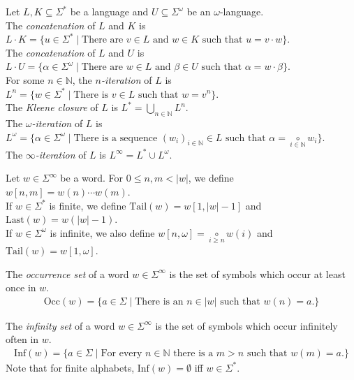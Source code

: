 \begin{defn}
	Let $L, K \subseteq \Sigma^*$ be a language and $U \subseteq \Sigma^\omega$ be an $\omega$-language.\\
	The \emph{concatenation} of $L$ and $K$ is $L \cdot K = \{ u \in \Sigma^* \mid \text{There are } v \in L \text{ and } \allowbreak w \in K \text{ such that } u = v \cdot w\}$.\\
	The \emph{concatenation} of $L$ and $U$ is $L \cdot U = \{ \alpha \in \Sigma^\omega \mid \text{There are } w \in L \text{ and } \allowbreak \beta \in U \text{ such that } \alpha = w \cdot \beta\}$.\\
	For some $n \in \mathbb{N}$, the \emph{$n$-iteration} of $L$ is $L^n = \{ w \in \Sigma^* \mid \text{There is } v \in L \text{ such that } w = v^n\}$.\\
	The \emph{Kleene closure} of $L$ is $L^* = \bigcup\limits_{n \in \mathbb{N}} L^n$.\\
	The \emph{$\omega$-iteration} of $L$ is $L^\omega = \{\alpha \in \Sigma^\omega \mid \text{There is a sequence } (w_i)_{i \in \mathbb{N}} \in L \text{ such that } \alpha = \underset{i \in \mathbb{N}}{\circ} w_i \}$.\\
	The \emph{$\infty$-iteration} of $L$ is $L^\infty = L^* \cup L^\omega$.
\end{defn}

\begin{defn}
	Let $w \in \Sigma^\infty$ be a word. For $0 \leq n, m < |w|$, we define $w[n,m] = w(n) \cdots w(m)$. \\
	If $w \in \Sigma^*$ is finite, we define $\text{Tail}(w) = w[1,|w|-1]$ and $\text{Last}(w) = w(|w|-1)$. \\
	If $w \in \Sigma^\omega$ is infinite, we also define $w[n, \omega] = \underset{i \geq n}{\circ} w(i)$ and $\text{Tail}(w) = w[1, \omega]$.
\end{defn}

\begin{defn}
	The \emph{occurrence set} of a word $w \in \Sigma^\infty$ is the set of symbols which occur at least once in $w$. 
	\begin{align*}
	\text{Occ}(w) = \{ a \in \Sigma \mid \text{There is an } n \in |w| \text{ such that } w(n) = a \text{.}\}
	\end{align*}
\end{defn}

\begin{defn}
	The \emph{infinity set} of a word $w \in \Sigma^\infty$ is the set of symbols which occur infinitely often in $w$.
	\begin{align*}
	\text{Inf}(w) = \{ a \in \Sigma \mid \text{For every } n \in \mathbb{N} \text{ there is a } m > n \text{ such that } w(m) = a \text{.}\}
	\end{align*}
	Note that for finite alphabets, $\text{Inf}(w) = \emptyset$ iff $w \in \Sigma^*$.
\end{defn}



